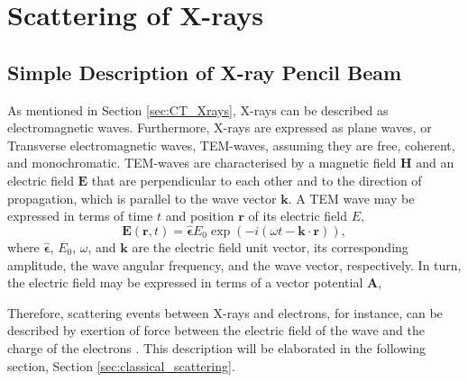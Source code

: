 \chapter{Scattering of X-rays}

\section{Simple Description of X-ray Pencil Beam}
As mentioned in Section \ref{sec:CT_Xrays}, X-rays can be described as electromagnetic waves.
Furthermore, X-rays are expressed as plane waves, or Transverse electromagnetic waves, TEM-waves, assuming they are free, coherent, and monochromatic.
TEM-waves are characterised by a magnetic field $\bm{H}$ and an electric field $\bm{E}$ that are perpendicular to each other and to the direction of propagation, which is parallel to the wave vector $\bm{k}$.
A TEM wave may be expressed in terms of time $t$ and position $\bm{r}$ of its electric field $E$,
\begin{equation}\label{eq:TEM_wave}
    \bm{E}(\bm{r},t) = \bm{\widehat{\epsilon}} \left. \right.  E_{0} \exp\left(-i\left(\omega t - \bm{k}\cdot\bm{r}\right)\right),
\end{equation}
where $\bm{\widehat{\epsilon}}$, $E_{0}$, $\omega$, and $\bm{k}$ are the electric field unit vector, its corresponding amplitude, the wave angular frequency, and the wave vector, respectively.
In turn, the electric field may be expressed in terms of a vector potential $\bm{A}$,

Therefore, scattering events between X-rays and electrons, for instance, can be described by
exertion of force between the electric field of the wave and the charge of the electrons \cite{mcmorrow2011elements}.
This description will be elaborated in the following section, Section \ref{sec:classical_scattering}.



